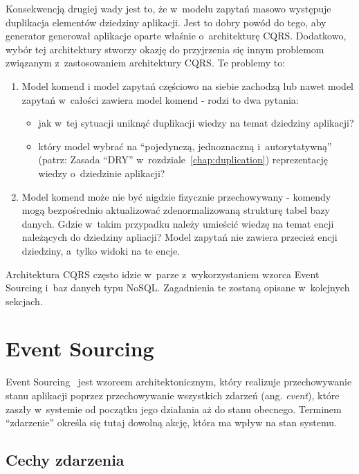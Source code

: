 Konsekwencją drugiej wady jest to, że w~modelu zapytań masowo występuje duplikacja elementów dziedziny aplikacji.
Jest to dobry powód do tego, aby generator generował aplikacje oparte właśnie o~architekturę CQRS.
Dodatkowo, wybór tej architektury stworzy okazję do przyjrzenia się innym problemom związanym z~zastosowaniem architektury CQRS.
Te problemy to:

\begin{enumerate}
 \item Model komend i model zapytań częściowo na siebie zachodzą lub nawet model zapytań w~całości zawiera model komend - rodzi to dwa pytania:
 \begin{itemize}
  \item jak w~tej sytuacji uniknąć duplikacji wiedzy na temat dziedziny aplikacji?
  \item który model wybrać na “pojedynczą, jednoznaczną i~autorytatywną” (patrz: Zasada ``DRY'' w~rozdziale~\ref{chap:duplication}) reprezentację wiedzy o~dziedzinie aplikacji?
 \end{itemize}
 \item Model komend może nie być nigdzie fizycznie przechowywany - komendy mogą bezpośrednio aktualizować zdenormalizowaną strukturę tabel bazy danych.
 Gdzie w~takim przypadku należy umieścić wiedzę na temat encji należących do dziedziny apliacji?
 Model zapytań nie zawiera przecież encji dziedziny, a~tylko widoki na te encje.
\end{enumerate}

Architektura CQRS często idzie w~parze z~wykorzystaniem wzorca Event Sourcing i~baz danych typu NoSQL.
Zagadnienia te zostaną opisane w~kolejnych sekcjach.



\section{Event Sourcing}

Event Sourcing~\cite{eventSourcing_msdn} jest wzorcem architektonicznym, który realizuje przechowywanie stanu aplikacji poprzez przechowywanie wszystkich zdarzeń (ang. \emph{event}), które zaszły w~systemie od początku jego działania aż do stanu obecnego.
Terminem ``zdarzenie'' określa się tutaj dowolną akcję, która ma wpływ na stan systemu.


\subsection{Cechy zdarzenia}

